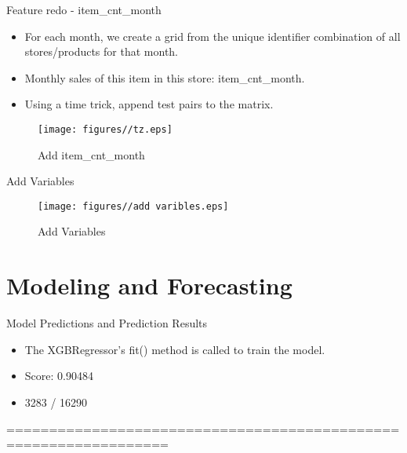 \documentclass[
size=14pt,
paper=smartboard,  %
mode=present, 		%
display=slides, 	%
style=tuliplab,  	%
pauseslide,
fleqn,leqno]{powerdot}
\begin{document}
	\begin{slide}{Feature redo - item\_cnt\_month}
		\begin{itemize}
			\item 
			For each month, we create a grid from the unique identifier combination of all stores/products for that month.
			\item
			Monthly sales of this item in this store: item\_cnt\_month.
			\item 
			Using a time trick, append test pairs to the matrix.
		\end{itemize}
		\begin{figure}
			\centering
			\texttt{[image: figures//tz.eps]}
			\caption{Add item\_cnt\_month}\label{fig:timg}
		\end{figure}
		
	\end{slide}
	
	
	\begin{slide}{Add Variables}
		\begin{figure}
			\centering
			\texttt{[image: figures//add varibles.eps]}
			\caption{Add Variables}\label{fig:timg}
		\end{figure}
		
	\end{slide}
	
	\section{Modeling and Forecasting}
	
	\begin{slide}{Model Predictions and Prediction Results}
		
		\begin{itemize}
			\item
			The XGBRegressor’s fit() method is called to train the model.
			\item 
			Score: 0.90484
			\item 
			3283 / 16290
		\end{itemize}
		
		
		
	\end{slide}
	
	
	
	=================================================================
	
	
\end{document}
